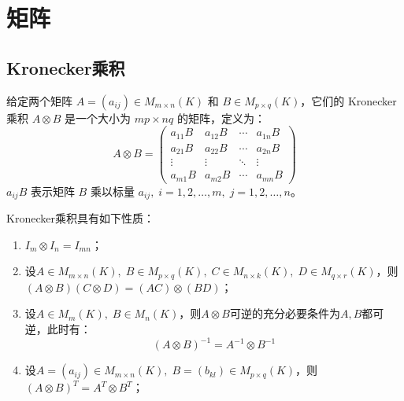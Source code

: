 \section{矩阵}

\subsection{Kronecker乘积}
\begin{definition}
	给定两个矩阵 \( A=(a_{ij}) \in M_{m\times n}(K) \) 和 \( B \in M_{p\times q}(K) \)，它们的 Kronecker 乘积 \( A \otimes B \) 是一个大小为 \( mp \times nq \) 的矩阵，定义为：
	\[
	A \otimes B = \begin{pmatrix}
		a_{11} B & a_{12} B & \cdots & a_{1n} B \\
		a_{21} B & a_{22} B & \cdots & a_{2n} B \\
		\vdots & \vdots & \ddots & \vdots \\
		a_{m1} B & a_{m2} B & \cdots & a_{mn} B
	\end{pmatrix}
	\]
	\( a_{ij} B \) 表示矩阵 \( B \) 乘以标量 \( a_{ij},\;i=1,2,\dots,m,\;j=1,2,\dots,n \)。
\end{definition}
\begin{property}\label{prop:Kronecker}
	Kronecker乘积具有如下性质：
	\begin{enumerate}
		\item $I_m\otimes I_n=I_{mn}$；
		\item 设$A\in M_{m\times n}(K),\;B\in M_{p\times q}(K),\;C\in M_{n\times k}(K),\;D\in M_{q\times r}(K)$，则$(A\otimes B)(C\otimes D)=(AC)\otimes (BD)$；
		\item 设$A\in M_{m}(K),\;B\in M_{n}(K)$，则$A\otimes B$可逆的充分必要条件为$A,B$都可逆，此时有：
		\begin{equation*}
			(A\otimes B)^{-1}=A^{-1}\otimes B^{-1}
		\end{equation*}
		\item 设$A=(a_{ij})\in M_{m\times n}(K),\;B=(b_{kl})\in M_{p\times q}(K)$，则$(A\otimes B)^T=A^T\otimes B^T$；
	\end{enumerate}
\end{property}
